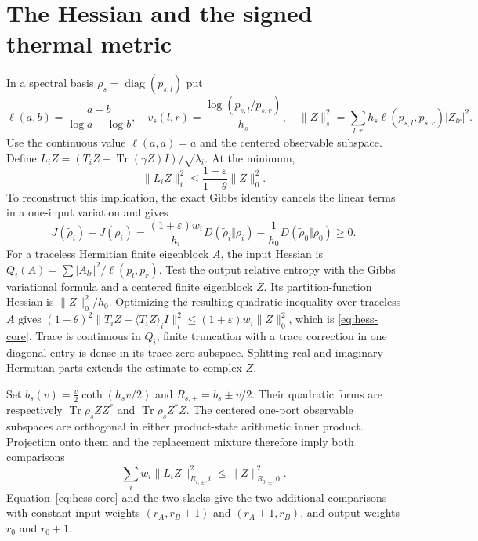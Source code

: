 \documentclass[11pt]{article}
\newcommand{\Tr}{\operatorname{Tr}}
\theoremstyle{remark}\newtheorem{remark}[theorem]{Remark}
\begin{document}
\section{The Hessian and the signed thermal metric}
In a spectral basis $\rho_s=\operatorname{diag}(p_{s,l})$ put
\[
 \ell(a,b)=\frac{a-b}{\log a-\log b},\quad
 v_s(l,r)=\frac{\log(p_{s,l}/p_{s,r})}{h_s},\quad
 \|Z\|_s^2=\sum_{l,r}h_s\ell(p_{s,l},p_{s,r})|Z_{lr}|^2.
\]
Use the continuous value $\ell(a,a)=a$ and the centered observable
subspace. Define $L_iZ=(T_iZ-\Tr(\gamma Z)I)/\sqrt{\lambda_i}$.
At the minimum,
\begin{equation}\label{eq:hess-core}
 \|L_iZ\|_i^2\le\frac{1+\varepsilon}{1-\theta}\|Z\|_0^2.
\end{equation}
To reconstruct this implication, the exact Gibbs identity cancels the
linear terms in a one-input variation and gives
\[
 J(\widetilde\rho_i)-J(\rho_i)=
 \frac{(1+\varepsilon)w_i}{h_i}D(\widetilde\rho_i\Vert\rho_i)
 -\frac1{h_0}D(\widetilde\rho_0\Vert\rho_0)\ge0.
\]
For a traceless Hermitian finite eigenblock $A$, the input Hessian is
$Q_i(A)=\sum|A_{lr}|^2/\ell(p_l,p_r)$. Test the output relative entropy
with the Gibbs variational formula and a centered finite eigenblock $Z$.
Its partition-function Hessian is $\|Z\|_0^2/h_0$.
Optimizing the resulting quadratic inequality over traceless $A$ gives
$(1-\theta)^2\|T_iZ-\langle T_iZ\rangle_iI\|_i^2
\le(1+\varepsilon)w_i\|Z\|_0^2$, which is \eqref{eq:hess-core}.
Trace is continuous in $Q_i$; finite truncation with a trace correction
in one diagonal entry is dense in its trace-zero subspace. Splitting real
and imaginary Hermitian parts extends the estimate to complex $Z$.

Set $b_s(v)=\frac v2\coth(h_sv/2)$ and $R_{s,\pm}=b_s\pm v/2$.
Their quadratic forms are respectively $\Tr\rho_sZZ^*$ and
$\Tr\rho_sZ^*Z$. The centered one-port observable subspaces are
orthogonal in either product-state arithmetic inner product. Projection
onto them and the replacement mixture therefore imply both comparisons
\[
 \sum_iw_i\|L_iZ\|_{R_{i,\pm},i}^2\le\|Z\|_{R_{0,\pm},0}^2.
\]
Equation~\eqref{eq:hess-core} and the two slacks give the two additional
comparisons with constant input weights $(r_A,r_B+1)$ and $(r_A+1,r_B)$,
and output weights $r_0$ and $r_0+1$.
\end{document}

